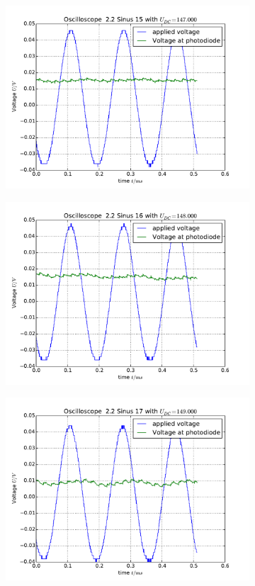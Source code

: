 \begin{figure}
\begin{subfigure}[b]{\picwidth}
        \includegraphics[width=\textwidth]{analysis/figures/22sinus15}
        \caption{}
    \end{subfigure}
    \begin{subfigure}[b]{\picwidth}
        \includegraphics[width=\textwidth]{analysis/figures/22sinus16}
        \caption{}
    \end{subfigure}
    \begin{subfigure}[b]{\picwidth}
        \includegraphics[width=\textwidth]{analysis/figures/22sinus17}

\end{subfigure}
\end{figure}
